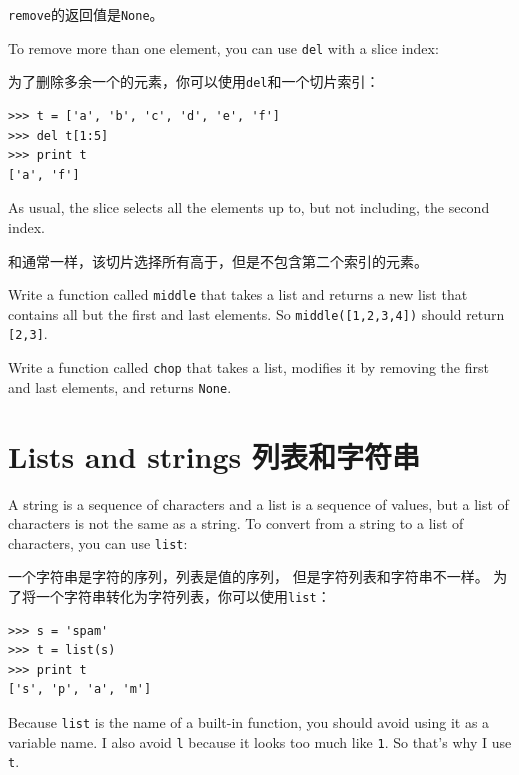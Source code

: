 \documentclass[10pt]{book}
\begin{document}
\begin{CJK}{UTF8}{gbsn}
{\tt remove}的返回值是{\tt None}。

To remove more than one element, you can use {\tt del} with
a slice index:

为了删除多余一个的元素，你可以使用{\tt del}和一个切片索引：

\begin{verbatim}
>>> t = ['a', 'b', 'c', 'd', 'e', 'f']
>>> del t[1:5]
>>> print t
['a', 'f']
\end{verbatim}
%
As usual, the slice selects all the elements up to, but not
including, the second index.

和通常一样，该切片选择所有高于，但是不包含第二个索引的元素。

\begin{exercise}

Write a function called \verb"middle" that takes a list and
returns a new list that contains all but the first and last
elements.  So \verb"middle([1,2,3,4])" should return \verb"[2,3]".

\end{exercise}

\begin{exercise}

Write a function called \verb"chop" that takes a list, modifies it
by removing the first and last elements, and returns {\tt None}.

\end{exercise}


\section{Lists and strings 列表和字符串}

A string is a sequence of characters and a list is a sequence
of values, but a list of characters is not the same as a
string.  To convert from a string to a list of characters,
you can use {\tt list}:

一个字符串是字符的序列，列表是值的序列，
但是字符列表和字符串不一样。
为了将一个字符串转化为字符列表，你可以使用{\tt list}：

\begin{verbatim}
>>> s = 'spam'
>>> t = list(s)
>>> print t
['s', 'p', 'a', 'm']
\end{verbatim}
%
Because {\tt list} is the name of a built-in function, you should
avoid using it as a variable name.  I also avoid {\tt l} because
it looks too much like {\tt 1}.  So that's why I use {\tt t}.


\end{CJK}
\end{document}
